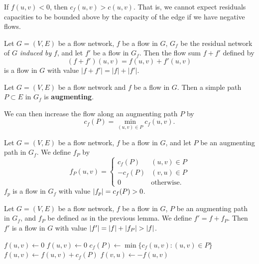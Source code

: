 \begin{remark}
    If $f(u,v) < 0$, then $c_f(u,v) > c(u,v)$.
    That is, we cannot expect residuals capacities to be bounded above
    by the capacity of the edge if we have negative flows.
\end{remark}

\begin{lemma}
    Let $G = (V, E)$ be a flow network, $f$ be a flow in $G$,
    $G_f$ be the residual network of $G$ \emph{induced by} $f$,
    and let $f'$ be a flow in $G_f$.
    Then the flow sum $f + f'$ defined by
    \[
        (f + f')(u,v) = f(u,v) + f'(u,v)
    \]
    is a flow in $G$ with value 
    $\lvert f+f' \rvert = \lvert f \rvert + \lvert f' \rvert$.
\end{lemma}

\begin{definition}
    Let $G = (V, E)$ be a flow network and $f$ be a flow in $G$.
    Then a simple path $P \subset E$ in $G_f$ is \textbf{augmenting}.
\end{definition}

We can then increase the flow along an augmenting path $P$ by
\[
    c_f(P) = \min_{(u,v) \in P} c_f(u,v).
\]

\begin{lemma}[]
    Let $G = (V,E)$ be a flow network,
    $f$ be a flow in $G$,
    and let $P$ be an augmenting path in $G_f$.
    We define $f_P$ by
    \[
        f_P(u,v) =
        \begin{cases}
            c_f(P)  & (u,v) \in P \\
            -c_f(P) & (v,u) \in P \\
            0       & \text{otherwise}.
        \end{cases}
    \]
    $f_p$ is a flow in $G_f$ with value $\left\lvert f_p\right\rvert = c_f(P) > 0$.
\end{lemma}

\begin{corollary}
    Let $G = (V,E)$ be a flow network,
    $f$ be a flow in $G$,
    $P$ be an augmenting path in $G_f$,
    and $f_P$ be defined as in the previous lemma.
    We define $f' = f + f_P$.
    Then $f'$ is a flow in $G$ with value
    $\left\lvert f'\right\rvert = \left\lvert f\right\rvert + \left\lvert f_P\right\rvert > \left\lvert f\right\rvert$.
\end{corollary}

\begin{algorithm}
    \hfill
    \begin{algorithmic}
                \State $f(u,v) \gets 0$
                \State $f(u,v) \gets 0$
            \EndFor
                \State $c_f(P) \gets \min\{c_f(u,v) : (u,v) \in P\}$
                    \State $f(u,v) \gets f(u,v) + c_f(P)$ 
                    \State $f(v,u) \gets -f(u,v)$
                \EndFor
            \EndWhile
        \EndProcedure
    \end{algorithmic}
\end{algorithm}

